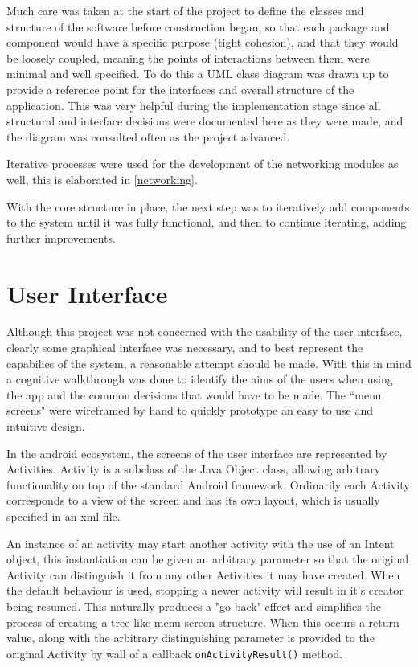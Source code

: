 Much care was taken at the start of the project to define the classes and structure of the software before construction began, so that each package and component would have a specific purpose (tight cohesion), and that they would be loosely coupled, meaning the points of interactions between them were minimal and well specified. To do this a UML class diagram was drawn up to provide a reference point for the interfaces and overall structure of the application. This was very helpful during the implementation stage since all structural and interface decisions were documented here as they were made, and the diagram was consulted often as the project advanced.

Iterative processes were used for the development of the networking modules as well, this is elaborated in \ref{networking}.

With the core structure in place, the next step was to iteratively add components to the system until it was fully functional, and then to continue iterating, adding further improvements.

\section{User Interface}

Although this project was not concerned with the usability of the user interface, clearly some graphical interface was necessary, and to best represent the capabilies of the system, a reasonable attempt should be made. With this in mind a cognitive walkthrough was done to identify the aims of the users when using the app and the common decisions that would have to be made. The ``menu screens" were wireframed by hand to quickly prototype an easy to use and intuitive design.

In the android ecosystem, the screens of the user interface are represented by Activities. Activity is a subclass of the Java Object class, allowing arbitrary functionality on top of the standard Android framework. Ordinarily each Activity corresponds to a view of the screen and has its own layout, which is usually specified in an xml file.

An instance of an activity may start another activity with the use of an Intent object, this instantiation can be given an arbitrary parameter so that the original Activity can distinguish it from any other Activities it may have created. When the default behaviour is used, stopping a newer activity will result in it's creator being resumed. This naturally produces a "go back" effect and simplifies the process of creating a tree-like menu screen structure. When this occurs a return value, along with the arbitrary distinguishing parameter is provided to the original Activity by wall of a callback {\tt onActivityResult()} method.

